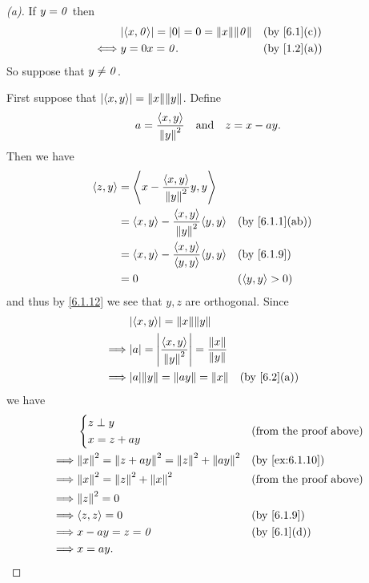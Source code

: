 \begin{proof}[(a)]
	If \(y = \mathit{0}\) then
	\begin{align*}
		     & \abs{\inn{x, \zv}} = \abs{0} = 0 = \norm{x} \norm{\zv} &  & \by{6.1}[c] \\
		\iff & y = 0x = \zv.                                          &  & \by{1.2}[a]
	\end{align*}
	So suppose that \(y \neq \mathit{0}\).

	First suppose that \(\abs{\inn{x, y}} = \norm{x} \norm{y}\).
	Define
	\[
		a = \frac{\left\langle x, y\right\rangle}{\left\lVert y\right\rVert^2} \quad \text{and} \quad z = x - ay.
	\]
	Then we have
	\begin{align*}
		\inn{z, y} & = \inn{x - \frac{\inn{x, y}}{\norm{y}^2} y, y}                                \\
		           & = \inn{x, y} - \frac{\inn{x, y}}{\norm{y}^2} \inn{y, y} &  & \by{6.1.1}[ab]   \\
		           & = \inn{x, y} - \frac{\inn{x, y}}{\inn{y, y}} \inn{y, y} &  & \by{6.1.9}       \\
		           & = 0                                                     &  & (\inn{y, y} > 0)
	\end{align*}
	and thus by \cref{6.1.12} we see that \(y, z\) are orthogonal.
	Since
	\begin{align*}
		         & \abs{\inn{x, y}} = \norm{x} \norm{y}                                                       \\
		\implies & \abs{a} = \abs{\frac{\inn{x, y}}{\norm{y}^2}} = \frac{\norm{x}}{\norm{y}}                  \\
		\implies & \abs{a} \norm{y} = \norm{ay} = \norm{x}                                   &  & \by{6.2}[a] \\
	\end{align*}
	we have
	\begin{align*}
		         & \begin{dcases}
			           z \perp y \\
			           x = z + ay
		           \end{dcases}                                          &  & \text{(from the proof above)}   \\
		\implies & \norm{x}^2 = \norm{z + ay}^2 = \norm{z}^2 + \norm{ay}^2 &  & \by{ex:6.1.10}                \\
		\implies & \norm{x}^2 = \norm{z}^2 + \norm{x}^2                    &  & \text{(from the proof above)} \\
		\implies & \norm{z}^2 = 0                                                                             \\
		\implies & \inn{z, z} = 0                                          &  & \by{6.1.9}                    \\
		\implies & x - ay = z = \zv                                        &  & \by{6.1}[d]                   \\
		\implies & x = ay.
	\end{align*}


\end{proof}
